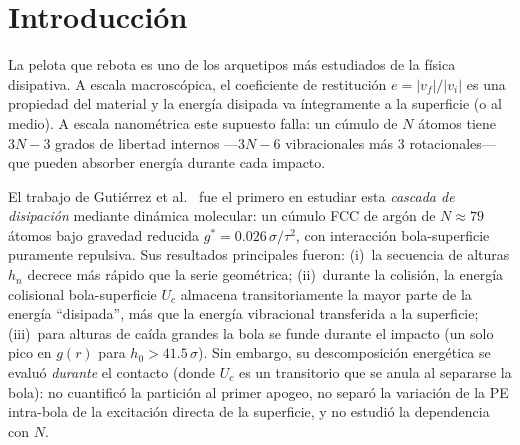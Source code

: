 \documentclass[aps,pre,twocolumn,reprint,superscriptaddress]{revtex4-2}
\newcommand{\cor}{e}
\newcommand{\gstar}{g^*}
\begin{document}
\begin{abstract}
En simulaciones largas ($5000\,\tau$, $N=79$, $h_0=28\,\sigma$), la primera
altura de rebote aproxima bien la escala $h_1\approx T_B/(Mg)=8.3\,\sigma$
que aquí proponemos (ratio $=0.96$), pero el sistema no converge a ese
attractor: la altura CM decae más rápido que $T_B$, y tras 23 rebotes
($t\approx660\,\tau$) la bola queda atrapada sobre la superficie con
$h_n\lesssim1\,\sigma$.

Con interacción LJ completa ($c_{ps}=1$, adhesión), la bola pega en los
$4N\times6h_0=24$ casos estudiados ($v$ hasta $2.0\,\sigma/\tau$). La energía
de adhesión $E_{\rm adh}\propto N^{0.73}$ (área de contacto) supera
en todos los casos a la energía CM disponible tras el rebote; una
extrapolación de orden de magnitud sitúa el umbral en
$h_0^*(N)\sim260$--$440\,\sigma$ con $h_0^*\propto N^{-0.27}$.
\end{abstract}


\maketitle

\section{Introducción}
\label{sec:intro}

La pelota que rebota es uno de los arquetipos más estudiados de la física
disipativa. A escala macroscópica, el coeficiente de restitución
$\cor = |v_f|/|v_i|$ es una propiedad del material y la energía disipada
va íntegramente a la superficie (o al medio). A escala nanométrica este
supuesto falla: un cúmulo de $N$ átomos tiene $3N-3$ grados de libertad
internos ---$3N-6$ vibracionales más 3 rotacionales--- que pueden absorber
energía durante cada impacto.

El trabajo de Gutiérrez et al.~\cite{Gutierrez2012} fue el primero en estudiar
esta \emph{cascada de disipación} mediante dinámica molecular: un cúmulo FCC
de argón de $N\approx79$ átomos bajo gravedad reducida $\gstar=0.026\,\sigma/\tau^2$,
con interacción bola-superficie puramente repulsiva. Sus resultados principales
fueron: (i)~la secuencia de alturas $h_n$ decrece más rápido que la serie
geométrica; (ii)~durante la colisión, la energía colisional bola-superficie
$U_c$ almacena transitoriamente la mayor parte de la energía ``disipada'',
más que la energía vibracional transferida a la superficie;
(iii)~para alturas de caída grandes la bola se funde durante el impacto
(un solo pico en $g(r)$ para $h_0>41.5\,\sigma$).
Sin embargo, su descomposición energética se evaluó \emph{durante} el
contacto (donde $U_c$ es un transitorio que se anula al separarse la bola):
no cuantificó la partición al primer apogeo, no separó la variación de la PE
intra-bola de la excitación directa de la superficie, y no estudió la
dependencia con $N$.
\end{document}
